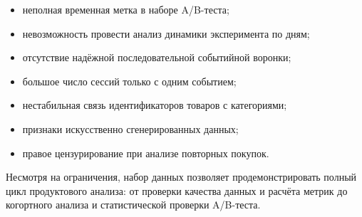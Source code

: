\documentclass[12pt,a4paper]{extarticle}
\begin{document}
\begin{itemize}
    \item неполная временная метка в наборе A/B-теста;
    \item невозможность провести анализ динамики эксперимента по дням;
    \item отсутствие надёжной последовательной событийной воронки;
    \item большое число сессий только с одним событием;
    \item нестабильная связь идентификаторов товаров с категориями;
    \item признаки искусственно сгенерированных данных;
    \item правое цензурирование при анализе повторных покупок.
\end{itemize}

Несмотря на ограничения, набор данных позволяет продемонстрировать
полный цикл продуктового анализа: от проверки качества данных и
расчёта метрик до когортного анализа и статистической проверки
A/B-теста.
\end{document}
